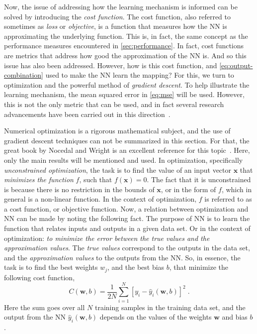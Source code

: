 Now, the issue of addressing how the learning mechanism is informed can be solved by 
introducing the \emph{cost function}. The cost function, also referred to sometimes as 
\emph{loss} or \emph{objective}, is a function that measures how the NN is approximating 
the underlying function. This is, in fact, the same concept as the performance measures 
encountered in \autoref{sec:performance}. In fact, cost functions are metrics that address 
how good the approximation of the NN is. And so this issue has also been addressed. 
However, how is this cost function, and \autoref{eq:output-combination} used to make the NN 
learn the mapping? For this, we turn to optimization and the powerful method of \emph{gradient descent}. To help illustrate the learning mechanism, the mean squared error in 
\autoref{eq:mse} will be used. However, this is not the only metric that can be used, and 
in fact several research advancements have been carried out in this direction~\cite{fontenla-romeroNewConvexObjective2010,liDiversityPromotingObjectiveFunction2016}.

Numerical optimization is a rigorous mathematical subject, and the use of gradient descent techniques can not be summarized in this section. For that, the great book by Nocedal and Wright is an excellent reference for this topic~\cite{nocedalNumericalOptimization2006}.
Here, only the main results will be mentioned and used. In optimization, specifically \emph{unconstrained optimization}, the task is to find the value of an input vector \(\bm{x}\) that \emph{minimizes the function} \(f\), such that \(f(\bm{x}) = 0\). The fact that it is unconstrained is because there is no restriction in the bounds of \(\bm{x}\), or in the form of \(f\), which in general is a non-linear function. In the context of optimization, \(f\) is referred to as a cost function, or objective function.
Now, a relation between optimization and NN can be made by noting the following fact. The 
purpose of NN is to learn the function that relates inputs and outputs in a given data set. 
Or in the context of optimization: \emph{to minimize the error between the true values and 
the approximation values}. The \emph{true values} correspond to the outputs in the data 
set, and the \emph{approximation values} to the outputs from the NN. So, in essence, the 
task is to find the best weights \(w_j\), and the best bias \(b\), that minimize the 
following cost function,
\begin{equation}
    C(\bm{w}, b) = \frac{1}{2 N} \sum_{i=1}^{N} { \left[y_i - \hat{y}_{i}(\bm{w}, b) \right] }^2
    \; .
    \label{eq:cost-nn}
\end{equation}
Here the sum goes over all $N$ training samples in the training data set, and the output 
from the NN \(\hat{y}_{i}(\bm{w}, b)\) depends on the values of the weights
\(\bm{w}\) and bias \(b\).

